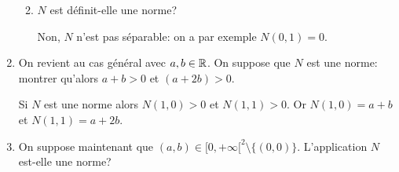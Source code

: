 \documentclass[a4paper]{tp_um}
\begin{document}
\begin{enumerate}
\begin{enumerate}
\begin{center}
\begin{tikzpicture}[scale=3]
            \end{tikzpicture}
        \end{center}

\medskip

    \item $N$ est définit-elle une norme?

        \medskip
        Non, $N$ n'est pas séparable: on a par exemple $N(0,1) = 0$.
        \medskip
        
\end{enumerate}


\item On revient au cas général avec $a,b\in\R$. On suppose que $N$ est  une norme: montrer qu'alors $a+b > 0$ et $(a+2b) > 0$.

\medskip

Si $N$ est une norme alors $N(1,0) > 0$ et $N(1,1) > 0.$
Or $N(1,0) = a+b$ et $N(1,1) = a+2b.$ 


\medskip

\item On suppose maintenant que $(a,b) \in [0,+\infty[^2 \setminus \{(0,0)\}.$
L'application $N$ est-elle une norme? 

\medskip


\end{enumerate}
\end{document}
